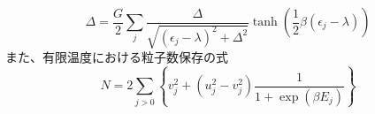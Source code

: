\documentclass[a4paper,10pt]{jsarticle}
\begin{document}
\begin{equation}
  \Delta = \dfrac{G}{2}\sum_{j} \dfrac{\Delta}{\sqrt{(\epsilon_j-\lambda)^2+\Delta^2}}\tanh(\dfrac{1}{2}\beta(\epsilon_j-\lambda))
\end{equation}
 また、有限温度における粒子数保存の式
 \begin{equation}
  N = 2\sum_{j>0}\left\{v_j^2+(u_j^2-v_j^2)\dfrac{1}{1+\exp(\beta E_j)}\right\}
 \end{equation}
\end{document}
